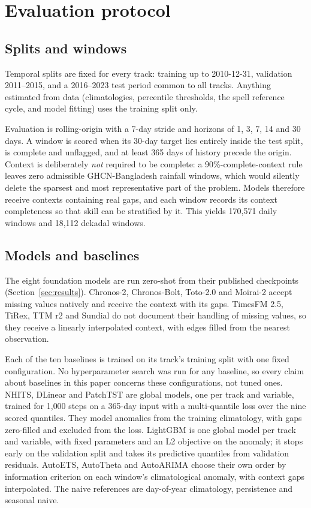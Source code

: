 \section{Evaluation protocol}
\label{sec:protocol}

\subsection{Splits and windows}

Temporal splits are fixed for every track: training up to 2010-12-31, validation 2011--2015, and a 2016--2023 test
period common to all tracks. Anything estimated from data (climatologies, percentile thresholds, the spell
reference cycle, and model fitting) uses the training split only.

Evaluation is rolling-origin with a 7-day stride and horizons of 1, 3, 7, 14 and 30 days. A window is scored when
its 30-day target lies entirely inside the test split, is complete and unflagged, and at least 365 days of history
precede the origin. Context is deliberately \emph{not} required to be complete: a 90\%-complete-context rule leaves
zero admissible GHCN-Bangladesh rainfall windows, which would silently delete the sparsest and most
representative part of the problem. Models therefore receive contexts containing real gaps, and each window
records its context completeness so that skill can be stratified by it. This yields 170{,}571 daily windows and
18{,}112 dekadal windows.

\subsection{Models and baselines}

The eight foundation models are run zero-shot from their published checkpoints (Section~\ref{sec:results}).
Chronos-2, Chronos-Bolt, Toto-2.0 and Moirai-2 accept missing values natively and receive the context with its gaps.
TimesFM 2.5, TiRex, TTM r2 and Sundial do not document their handling of missing values, so they receive a linearly
interpolated context, with edges filled from the nearest observation.

Each of the ten baselines is trained on its track's training split with one fixed configuration. No
hyperparameter search was run for any baseline, so every claim about baselines in this paper concerns these
configurations, not tuned ones. NHITS, DLinear and PatchTST are global models, one per track and variable, trained
for 1{,}000 steps on a 365-day input with a multi-quantile loss over the nine scored quantiles. They model
anomalies from the training climatology, with gaps zero-filled and excluded from the loss. LightGBM is one global
model per track and variable, with fixed parameters and an L2 objective on the anomaly; it stops early on the
validation split and takes its predictive quantiles from validation residuals. AutoETS, AutoTheta and AutoARIMA choose their own
order by information criterion on each window's climatological anomaly, with context gaps interpolated. The
naive references are day-of-year climatology, persistence and seasonal naive.

